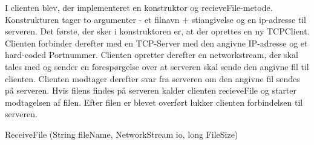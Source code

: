 I clienten blev, der implementeret en konstruktor og recieveFile-metode.
Konstrukturen tager to argumenter - et filnavn + stiangivelse og en ip-adresse til serveren.
Det første, der sker i konstruktoren er, at der oprettes en ny TCPClient. Clienten forbinder derefter med en TCP-Server med den angivne IP-adresse og et hard-coded Portnummer.
Clienten opretter derefter en networkstream, der skal tales med og sender en forespørgelse over at serveren skal sende den angivne fil til clienten. Clienten modtager derefter svar fra serveren om den angivne fil sendes på serveren. Hvis filens findes på serveren kalder clienten recieveFile og starter modtagelsen af filen.
Efter filen er blevet overført lukker clienten forbindelsen til serveren.

ReceiveFile (String fileName, NetworkStream io, long FileSize) 